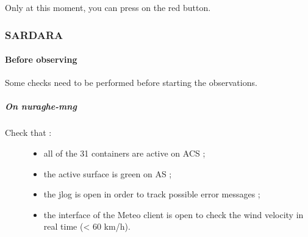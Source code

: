 \documentclass[letterpaper,10pt,english]{sphinxmanual}
\begin{document}
Only at this moment, you can press on the red button.


\subsubsection{SARDARA}
\label{Continuum/C-band/SARDARA/index:sardara}\label{Continuum/C-band/SARDARA/index::doc}

\paragraph{Before observing}
\label{Continuum/C-band/SARDARA/before-obs:before-observing}\label{Continuum/C-band/SARDARA/before-obs::doc}
Some checks need to be performed before starting the observations.


\subparagraph{On nuraghe-mng}
\label{Continuum/C-band/SARDARA/before-obs:on-nuraghe-mng}\begin{description}
\item[{Check that :}] \leavevmode\begin{itemize}
\item {} 
all of the 31 containers are active on ACS ;

\item {} 
the active surface is green on AS ;

\item {} 
the jlog is open in order to track possible error messages ;

\item {} 
the interface of the Meteo client is open to check the wind velocity in real time (\textless{} 60 km/h).

\end{itemize}

\end{description}
\end{document}

